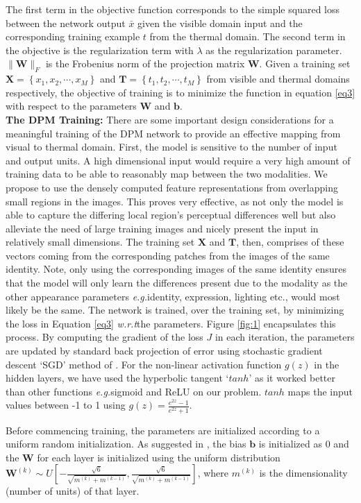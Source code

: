 \documentclass[smallextended,natbib]{svjour3}       \usepackage{graphicx}
\newcommand{\eg}{\emph{e.g.}}
\newcommand{\wrt}{\emph{w.r.t}}
\begin{document}
The first term in the objective function corresponds to the simple squared loss between the network output $\bar{x}$ given the visible domain input and the corresponding training example $t$ from the thermal domain. The second term in the objective is the regularization term with $\lambda$ as the regularization parameter. $\|\mathbf{W}\|_F$ is the Frobenius norm of the projection matrix $\mathbf{W}$. Given a training set $\mathbf{X}=\left\{x_1,x_2,\cdots,x_M\right\}$ and $\mathbf{T}=\left\{t_1,t_2,\cdots,t_M\right\}$  from visible and thermal domains respectively, the objective of training is to minimize the function in equation \ref{eq3} with respect to the parameters $\mathbf{W}$ and $\mathbf{b}$.
\\[0.5\baselineskip]\noindent\textbf{The DPM Training:} There are some important design considerations for a meaningful training of the DPM network to provide an effective mapping from visual to thermal domain. First, the model is sensitive to the number of input and output units. A high dimensional input would require a very high amount of training data to be able to reasonably map between the two modalities. We propose to use the densely computed feature representations from overlapping small regions in the images. This proves very effective, as not only the model is able to capture the differing local region's perceptual differences well but also alleviate the need of large training images and nicely present the input in relatively small dimensions. The training set $\mathbf{X}$ and $\mathbf{T}$, then, comprises of these vectors coming from the corresponding patches from the images of the same identity. Note, only using the corresponding images of the same identity ensures that the model will only learn the differences present due to the modality as the other appearance parameters \eg identity, expression, lighting etc., would most likely be the same. The network is trained, over the training set, by minimizing the loss in Equation \ref{eq3} \wrt the parameters. Figure \ref{fig:1} encapsulates this process. By computing the gradient of the loss $J$ in each iteration, the parameters are updated by standard back projection of error using stochastic gradient descent `SGD' method of \cite{glorot2010}. For the non-linear activation function $g(z)$ in the hidden layers, we have used the hyperbolic tangent `$tanh$' as it worked better than other functions \eg sigmoid and ReLU on our problem. $tanh$ maps the input values between -1 to 1 using $g(z)= \frac{e^{2z}-1}{e^{2z}+1}$.

Before commencing training, the parameters are initialized according to a uniform random initialization. As suggested in \cite{glorot2010}, the bias $\mathbf{b}$ is initialized as $0$ and the $\mathbf{W}$ for each layer is initialized using the uniform distribution $\mathbf{W}^{(k)}\sim  U\left[-\frac{\sqrt6}{\sqrt{m^{(k)}+m^{(k-1)}}},\frac{\sqrt6}{\sqrt{m^{(k)}+m^{(k-1)}}}\right]$, where $m^{(k)}$ is the dimensionality (number of units) of that layer.   
\end{document}
